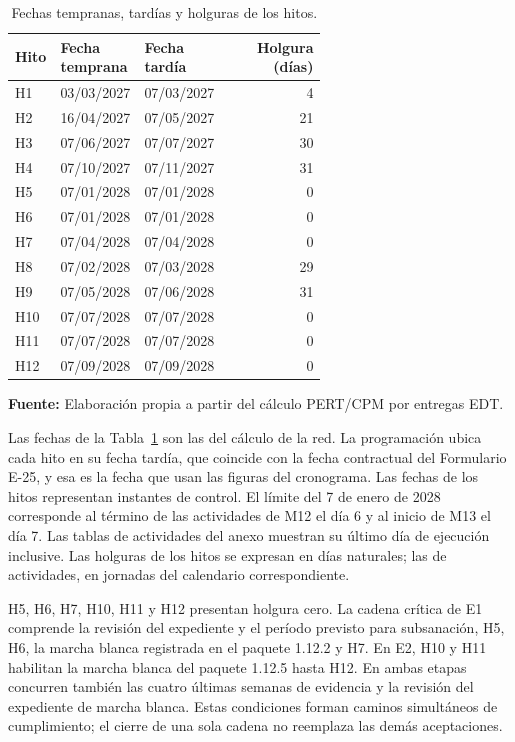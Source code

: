 \documentclass[11pt]{article}
\begin{document}
\begin{longtable}{p{0.12\linewidth}p{0.25\linewidth}p{0.25\linewidth}r}
\caption{Fechas tempranas, tardías y holguras de los hitos.}\label{tab:7-5}\\
\toprule
\textbf{Hito} & \textbf{Fecha temprana} & \textbf{Fecha tardía} & \textbf{Holgura (días)} \\
\midrule
\endhead
\bottomrule
\endlastfoot
H1 & 03/03/2027 & 07/03/2027 & 4 \\
H2 & 16/04/2027 & 07/05/2027 & 21 \\
H3 & 07/06/2027 & 07/07/2027 & 30 \\
H4 & 07/10/2027 & 07/11/2027 & 31 \\
H5 & 07/01/2028 & 07/01/2028 & 0 \\
H6 & 07/01/2028 & 07/01/2028 & 0 \\
H7 & 07/04/2028 & 07/04/2028 & 0 \\
H8 & 07/02/2028 & 07/03/2028 & 29 \\
H9 & 07/05/2028 & 07/06/2028 & 31 \\
H10 & 07/07/2028 & 07/07/2028 & 0 \\
H11 & 07/07/2028 & 07/07/2028 & 0 \\
H12 & 07/09/2028 & 07/09/2028 & 0 \\
\end{longtable}
\textbf{Fuente:} Elaboración propia a partir del cálculo PERT/CPM por entregas EDT.

Las fechas de la Tabla~\ref{tab:7-5} son las del cálculo de la red. La programación ubica cada hito en su fecha tardía, que coincide con la fecha contractual del Formulario E-25, y esa es la fecha que usan las figuras del cronograma. Las fechas de los hitos representan instantes de control. El límite del 7 de enero de 2028 corresponde al término de las actividades de M12 el día 6 y al inicio de M13 el día 7. Las tablas de actividades del anexo muestran su último día de ejecución inclusive. Las holguras de los hitos se expresan en días naturales; las de actividades, en jornadas del calendario correspondiente.

H5, H6, H7, H10, H11 y H12 presentan holgura cero. La cadena crítica de E1 comprende la revisión del expediente y el período previsto para subsanación, H5, H6, la marcha blanca registrada en el paquete 1.12.2 y H7. En E2, H10 y H11 habilitan la marcha blanca del paquete 1.12.5 hasta H12. En ambas etapas concurren también las cuatro últimas semanas de evidencia y la revisión del expediente de marcha blanca. Estas condiciones forman caminos simultáneos de cumplimiento; el cierre de una sola cadena no reemplaza las demás aceptaciones.
\end{document}
